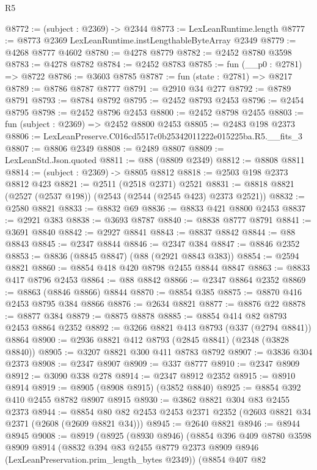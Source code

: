 \begin{lexlean}{R5}
\begin{coremodule}
@8772 := (subject : @2369) -> @2344
@8773 := LexLeanRuntime.length
@8777 := @8773 @2369 LexLeanRuntime.instLengthableByteArray @2349
@8779 := @4268 @8777 @4602
@8780 := @4278 @8779
@8782 := @2452 @8780 @3598
@8783 := @4278 @8782
@8784 := @2452 @8783
@8785 := fun (__p0 : @2781) => @8722
@8786 := @3603 @8785
@8787 := fun (state : @2781) => @8217
@8789 := @8786 @8787 @8777
@8791 := @2910 @34 @277
@8792 := @8789 @8791
@8793 := @8784 @8792
@8795 := @2452 @8793 @2453
@8796 := @2454 @8795
@8798 := @2452 @8796 @2453
@8800 := @2452 @8798 @2455
@8803 := fun (subject : @2369) => @2452 @8800 @2453
@8805 := @2483 @198 @2373
@8806 := LexLeanPreserve.C016cd5517c0b25342011222e015225ba.R5.__fits_3
@8807 := @8806 @2349
@8808 := @2489 @8807
@8809 := LexLeanStd.Json.quoted
@8811 := @88 (@8809 @2349)
@8812 := @8808 @8811
@8814 := (subject : @2369) -> @8805 @8812
@8818 := @2503 @198 @2373 @8812 @423
@8821 := @2511 (@2518 @2371) @2521
@8831 := @8818 @8821 (@2527 (@2537 @198)) (@2543 (@2544 (@2545 @423) @2373 @2521))
@8832 := @2580 @8821
@8833 := @8832 @69
@8836 := @8833 @421 @8800 @2453
@8837 := @2921 @383
@8838 := @3693 @8787
@8840 := @8838 @8777 @8791
@8841 := @3691 @8840
@8842 := @2927 @8841
@8843 := @8837 @8842
@8844 := @88 @8843
@8845 := @2347 @8844
@8846 := @2347 @384
@8847 := @8846 @2352
@8853 := @8836 (@8845 @8847) (@88 (@2921 @8843 @383))
@8854 := @2594 @8821
@8860 := @8854 @418 @420 @8798 @2455 @8844 @8847
@8863 := @8833 @417 @8796 @2453
@8864 := @88 @8842
@8866 := @2347 @8864 @2352
@8869 := @8863 (@8846 @8866) @8844
@8870 := @8854 @385
@8875 := @8870 @416 @2453 @8795 @384 @8866
@8876 := @2634 @8821
@8877 := @8876 @22
@8878 := @8877 @384
@8879 := @8875 @8878
@8885 := @8854 @414 @82 @8793 @2453 @8864 @2352
@8892 := @3266 @8821 @413 @8793 (@337 (@2794 @8841)) @8864
@8900 := @2936 @8821 @412 @8793 (@2845 @8841) (@2348 (@3828 @8840))
@8905 := @3207 @8821 @300 @411 @8783 @8792
@8907 := @3836 @304 @2373
@8908 := @2347 @8907
@8909 := @337 @8777
@8910 := @2347 @8909
@8912 := @3090 @338 @278
@8914 := @2347 @8912 @2352
@8915 := @8910 @8914
@8919 := @8905 (@8908 @8915) (@3852 @8840)
@8925 := @8854 @392 @410 @2455 @8782 @8907 @8915
@8930 := @3862 @8821 @304 @83 @2455 @2373
@8944 := @8854 @80 @82 @2453 @2453 @2371 @2352 (@2603 @8821 @34 @2371 (@2608 (@2609 @8821 @34)))
@8945 := @2640 @8821
@8946 := @8944 @8945
@9008 := @8919
    (@8925
      (@8930 @8946)
      (@8854
        @396
        @409
        @8780
        @3598
        @8909
        @8914
        (@8832 @394 @83 @2455 @8779 @2373 @8909 @8946 (LexLeanPreservation.prim_length_bytes @2349))
        (@8854
          @407
          @82

\end{coremodule}
\end{lexlean}
